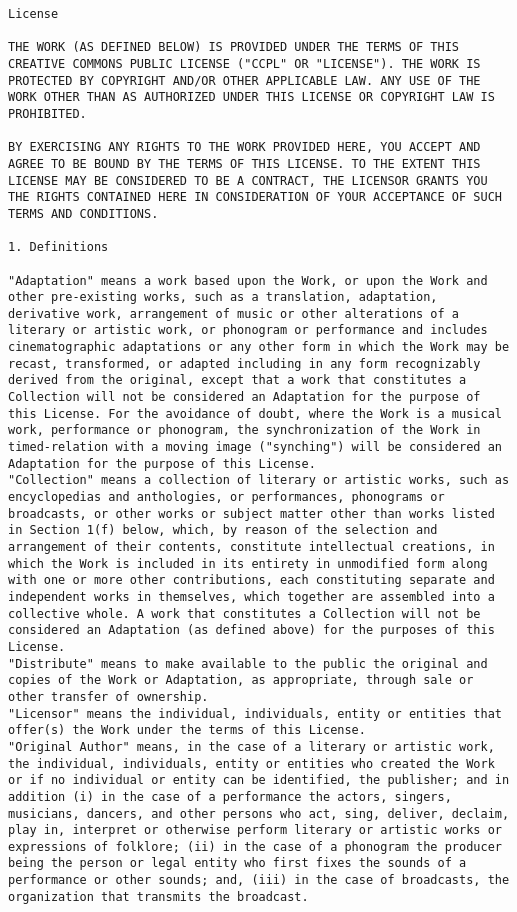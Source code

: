 \documentclass[10pt,A4]{book}
\begin{document}
\begin{verbatim}
License

THE WORK (AS DEFINED BELOW) IS PROVIDED UNDER THE TERMS OF THIS CREATIVE COMMONS PUBLIC LICENSE ("CCPL" OR "LICENSE"). THE WORK IS PROTECTED BY COPYRIGHT AND/OR OTHER APPLICABLE LAW. ANY USE OF THE WORK OTHER THAN AS AUTHORIZED UNDER THIS LICENSE OR COPYRIGHT LAW IS PROHIBITED.

BY EXERCISING ANY RIGHTS TO THE WORK PROVIDED HERE, YOU ACCEPT AND AGREE TO BE BOUND BY THE TERMS OF THIS LICENSE. TO THE EXTENT THIS LICENSE MAY BE CONSIDERED TO BE A CONTRACT, THE LICENSOR GRANTS YOU THE RIGHTS CONTAINED HERE IN CONSIDERATION OF YOUR ACCEPTANCE OF SUCH TERMS AND CONDITIONS.

1. Definitions

"Adaptation" means a work based upon the Work, or upon the Work and other pre-existing works, such as a translation, adaptation, derivative work, arrangement of music or other alterations of a literary or artistic work, or phonogram or performance and includes cinematographic adaptations or any other form in which the Work may be recast, transformed, or adapted including in any form recognizably derived from the original, except that a work that constitutes a Collection will not be considered an Adaptation for the purpose of this License. For the avoidance of doubt, where the Work is a musical work, performance or phonogram, the synchronization of the Work in timed-relation with a moving image ("synching") will be considered an Adaptation for the purpose of this License.
"Collection" means a collection of literary or artistic works, such as encyclopedias and anthologies, or performances, phonograms or broadcasts, or other works or subject matter other than works listed in Section 1(f) below, which, by reason of the selection and arrangement of their contents, constitute intellectual creations, in which the Work is included in its entirety in unmodified form along with one or more other contributions, each constituting separate and independent works in themselves, which together are assembled into a collective whole. A work that constitutes a Collection will not be considered an Adaptation (as defined above) for the purposes of this License.
"Distribute" means to make available to the public the original and copies of the Work or Adaptation, as appropriate, through sale or other transfer of ownership.
"Licensor" means the individual, individuals, entity or entities that offer(s) the Work under the terms of this License.
"Original Author" means, in the case of a literary or artistic work, the individual, individuals, entity or entities who created the Work or if no individual or entity can be identified, the publisher; and in addition (i) in the case of a performance the actors, singers, musicians, dancers, and other persons who act, sing, deliver, declaim, play in, interpret or otherwise perform literary or artistic works or expressions of folklore; (ii) in the case of a phonogram the producer being the person or legal entity who first fixes the sounds of a performance or other sounds; and, (iii) in the case of broadcasts, the organization that transmits the broadcast.

\end{verbatim}
\end{document}
